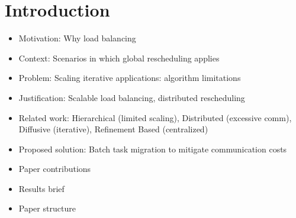 \section{Introduction}

\begin{itemize}
	\item Motivation: Why load balancing
	\item Context: Scenarios in which global rescheduling applies
	\item Problem: Scaling iterative applications: algorithm limitations
	\item Justification: Scalable load balancing, distributed rescheduling
	\item Related work: Hierarchical (limited scaling), Distributed (excessive comm), Diffusive (iterative), Refinement Based (centralized)
	\item Proposed solution: Batch task migration to mitigate communication costs
	\item Paper contributions	
	\item Results brief
	\item Paper structure
\end{itemize}

